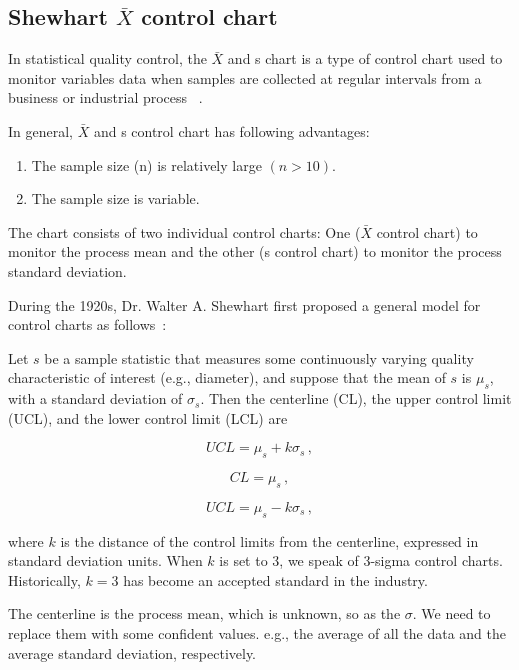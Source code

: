 \subsection{Shewhart $\bar{X}$ control chart}
In statistical quality control, the $\bar{X}$ and s chart is a type of control chart used to monitor variables data when samples are collected at regular intervals from a business or industrial process ~\cite{heckert2002handbook}. 

In general, $\bar{X}$ and s control chart has following advantages:
\begin{enumerate}
    \item The sample size (n) is relatively large $(n>10)$.
    \item The sample size is variable.
\end{enumerate}

The chart consists of two individual control charts: One ($\bar{X}$ control chart) to monitor the process mean and the other (s control chart) to monitor the process standard deviation.

During the 1920s, Dr. Walter A. Shewhart first proposed a general model for control charts as follows~\cite{adams1999manufacturing}:

Let $s$ be a sample statistic that measures some continuously varying quality characteristic of interest (e.g., diameter), and suppose that the mean of $s$ is $\mu_{s}$, with a standard deviation of $\sigma_{s}$. Then the centerline (CL), the upper control limit (UCL), and the lower control limit (LCL) are


\begin{equation}
    U C L=\mu_{s}+k \sigma_{s}\,,
    \label{equ:UCL}
\end{equation}

\begin{equation}
    C L=\mu_{s}\,,
    \label{equ:CL}
\end{equation}

\begin{equation}
    U C L=\mu_{s}-k \sigma_{s}\,,
    \label{equ:LCL}
\end{equation}

where $k$ is the distance of the control limits from the centerline, expressed in standard deviation units. When $k$ is set to 3, we speak of 3-sigma control charts. Historically, $k=3$ has become an accepted standard in the industry.

The centerline is the process mean, which is unknown, so as the $\sigma$. We need to replace them with some confident values. e.g., the average of all the data and the average standard deviation, respectively. 

